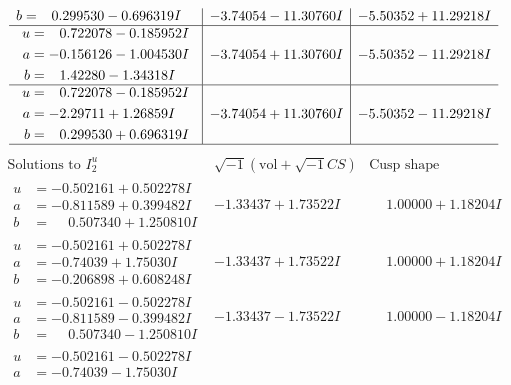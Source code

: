 \documentclass[1p]{elsarticle_modified}
\theoremstyle{definition}
\newcommand{\I}{\sqrt{-1}}
\begin{document}
$$\begin{array}{c|c|c}
\begin{aligned}
b &= \phantom{-}0.299530 - 0.696319 I\end{aligned}
 & -3.74054 - 11.30760 I & -5.50352 + 11.29218 I \\ \hline\begin{aligned}
u &= \phantom{-}0.722078 - 0.185952 I \\
a &= -0.156126 - 1.004530 I \\
b &= \phantom{-}1.42280 - 1.34318 I\end{aligned}
 & -3.74054 + 11.30760 I & -5.50352 - 11.29218 I \\ \hline\begin{aligned}
u &= \phantom{-}0.722078 - 0.185952 I \\
a &= -2.29711 + 1.26859 I \\
b &= \phantom{-}0.299530 + 0.696319 I\end{aligned}
 & -3.74054 + 11.30760 I & -5.50352 - 11.29218 I\\
 \hline 
 \end{array}$$\newpage$$\begin{array}{c|c|c}  
\text{Solutions to }I^u_{2}& \I (\text{vol} + \sqrt{-1}CS) & \text{Cusp shape}\\
 \hline 
\begin{aligned}
u &= -0.502161 + 0.502278 I \\
a &= -0.811589 + 0.399482 I \\
b &= \phantom{-}0.507340 + 1.250810 I\end{aligned}
 & -1.33437 + 1.73522 I & \phantom{-}1.00000 + 1.18204 I \\ \hline\begin{aligned}
u &= -0.502161 + 0.502278 I \\
a &= -0.74039 + 1.75030 I \\
b &= -0.206898 + 0.608248 I\end{aligned}
 & -1.33437 + 1.73522 I & \phantom{-}1.00000 + 1.18204 I \\ \hline\begin{aligned}
u &= -0.502161 - 0.502278 I \\
a &= -0.811589 - 0.399482 I \\
b &= \phantom{-}0.507340 - 1.250810 I\end{aligned}
 & -1.33437 - 1.73522 I & \phantom{-}1.00000 - 1.18204 I \\ \hline\begin{aligned}
u &= -0.502161 - 0.502278 I \\
a &= -0.74039 - 1.75030 I \\

\end{aligned}
\end{array}$$
\end{document}
